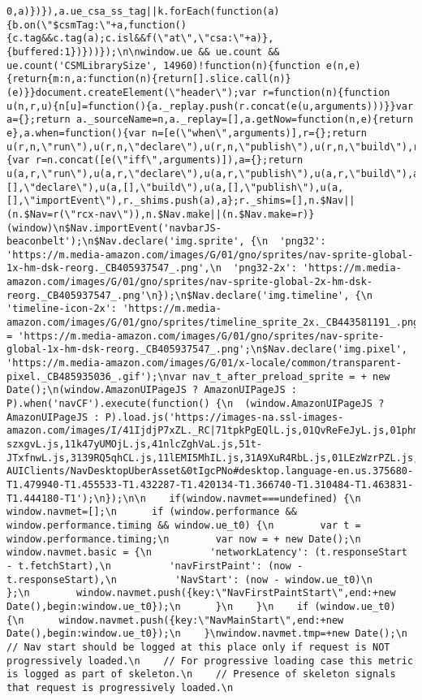\documentclass[
]{article}
\begin{document}
\begin{verbatim}
0,a)})}),a.ue_csa_ss_tag||k.forEach(function(a){b.on(\"$csmTag:\"+a,function(){c.tag&&c.tag(a);c.isl&&f(\"at\",\"csa:\"+a)},{buffered:1})}))});\n\nwindow.ue && ue.count && ue.count('CSMLibrarySize', 14960)!function(n){function e(n,e){return{m:n,a:function(n){return[].slice.call(n)}(e)}}document.createElement(\"header\");var r=function(n){function u(n,r,u){n[u]=function(){a._replay.push(r.concat(e(u,arguments)))}}var a={};return a._sourceName=n,a._replay=[],a.getNow=function(n,e){return e},a.when=function(){var n=[e(\"when\",arguments)],r={};return u(r,n,\"run\"),u(r,n,\"declare\"),u(r,n,\"publish\"),u(r,n,\"build\"),r.depends=n,r.iff=function(){var r=n.concat([e(\"iff\",arguments)]),a={};return u(a,r,\"run\"),u(a,r,\"declare\"),u(a,r,\"publish\"),u(a,r,\"build\"),a},r},u(a,[],\"declare\"),u(a,[],\"build\"),u(a,[],\"publish\"),u(a,[],\"importEvent\"),r._shims.push(a),a};r._shims=[],n.$Nav||(n.$Nav=r(\"rcx-nav\")),n.$Nav.make||(n.$Nav.make=r)}(window)\n$Nav.importEvent('navbarJS-beaconbelt');\n$Nav.declare('img.sprite', {\n  'png32': 'https://m.media-amazon.com/images/G/01/gno/sprites/nav-sprite-global-1x-hm-dsk-reorg._CB405937547_.png',\n  'png32-2x': 'https://m.media-amazon.com/images/G/01/gno/sprites/nav-sprite-global-2x-hm-dsk-reorg._CB405937547_.png'\n});\n$Nav.declare('img.timeline', {\n  'timeline-icon-2x': 'https://m.media-amazon.com/images/G/01/gno/sprites/timeline_sprite_2x._CB443581191_.png'\n});\nwindow._navbarSpriteUrl = 'https://m.media-amazon.com/images/G/01/gno/sprites/nav-sprite-global-1x-hm-dsk-reorg._CB405937547_.png';\n$Nav.declare('img.pixel', 'https://m.media-amazon.com/images/G/01/x-locale/common/transparent-pixel._CB485935036_.gif');\nvar nav_t_after_preload_sprite = + new Date();\n(window.AmazonUIPageJS ? AmazonUIPageJS : P).when('navCF').execute(function() {\n  (window.AmazonUIPageJS ? AmazonUIPageJS : P).load.js('https://images-na.ssl-images-amazon.com/images/I/41IjdjP7xZL._RC|71tpkPgEQlL.js,01QvReFeJyL.js,01phmzCOwJL.js,01eOvPdxG7L.js,61proBBYkaL.js,41gNKoK0s7L.js,115pV8Rl02L.js,21QA-szxgvL.js,11k47yUMOjL.js,41nlcZghVaL.js,51t-JTxfnwL.js,3139RQ5qhCL.js,11lEMI5MhIL.js,31A9XuR4RbL.js,01LEzWzrPZL.js,01AqeWA7PKL.js_.js?AUIClients/NavDesktopUberAsset&0tIgcPNo#desktop.language-en.us.375680-T1.479940-T1.455533-T1.432287-T1.420134-T1.366740-T1.310484-T1.463831-T1.444180-T1');\n});\n\n    if(window.navmet===undefined) {\n      window.navmet=[];\n      if (window.performance && window.performance.timing && window.ue_t0) {\n        var t = window.performance.timing;\n        var now = + new Date();\n        window.navmet.basic = {\n          'networkLatency': (t.responseStart - t.fetchStart),\n          'navFirstPaint': (now - t.responseStart),\n          'NavStart': (now - window.ue_t0)\n        };\n        window.navmet.push({key:\"NavFirstPaintStart\",end:+new Date(),begin:window.ue_t0});\n      }\n    }\n    if (window.ue_t0) {\n      window.navmet.push({key:\"NavMainStart\",end:+new Date(),begin:window.ue_t0});\n    }\nwindow.navmet.tmp=+new Date();\n    // Nav start should be logged at this place only if request is NOT progressively loaded.\n    // For progressive loading case this metric is logged as part of skeleton.\n    // Presence of skeleton signals that request is progressively loaded.\n    
\end{verbatim}
\end{document}
